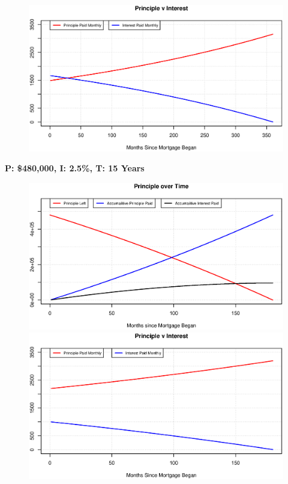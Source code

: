 \documentclass[12pt]{article}
\newenvironment{Section}[1]{}{\newpage}
\begin{document}
\begin{Section}{Example C}
\begin{figure}[h!]
			\includegraphics[width = \linewidth]{Figures/PVT.C800.S130.T30}
		\end{figure}
		\newpage
		\textbf{\Large P: \$480,000, I: 2.5\%, T: 15 Years}
		\begin{figure}[h!]
			\centering
			\includegraphics[width = \linewidth]{Figures/POT.C800.S130.T15}
			\includegraphics[width = \linewidth]{Figures/PVT.C800.S130.T15}
		\end{figure}
	\end{Section}
\end{document}
